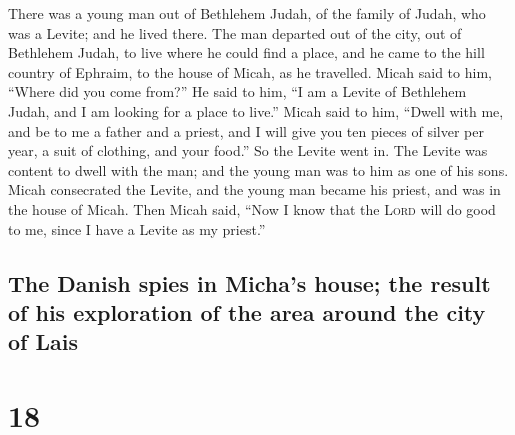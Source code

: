  There was a young man out of Bethlehem Judah, of the
family of Judah, who was a Levite; and he lived there. 
The man departed out of the city, out of Bethlehem Judah, to live where
he could find a place, and he came to the hill country of Ephraim, to
the house of Micah, as he travelled.  Micah said to him,
``Where did you come from?'' He said to him, ``I am a Levite of
Bethlehem Judah, and I am looking for a place to live.'' 
Micah said to him, ``Dwell with me, and be to me a father and a priest,
and I will give you ten pieces of silver per year, a suit of clothing,
and your food.'' So the Levite went in.  The Levite was
content to dwell with the man; and the young man was to him as one of
his sons.  Micah consecrated the Levite, and the young
man became his priest, and was in the house of Micah. 
Then Micah said, ``Now I know that the \textsc{Lord} will do good to me,
since I have a Levite as my priest.''

\hypertarget{the-danish-spies-in-michas-house-the-result-of-his-exploration-of-the-area-around-the-city-of-lais}{%
\subsection{The Danish spies in Micha's house; the result of his
exploration of the area around the city of
Lais}\label{the-danish-spies-in-michas-house-the-result-of-his-exploration-of-the-area-around-the-city-of-lais}}

\hypertarget{section-17}{%
\section{18}\label{section-17}}

